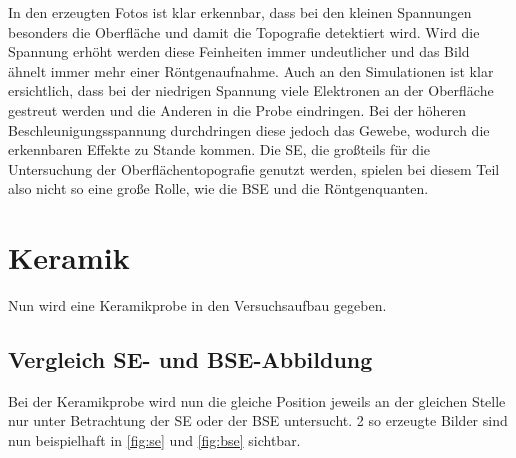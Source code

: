 \documentclass[12pt,english,ngerman]{scrartcl}
\begin{document}
In den erzeugten Fotos ist klar erkennbar, dass bei den kleinen Spannungen
besonders die Oberfläche und damit die Topografie detektiert wird. Wird die
Spannung erhöht werden diese Feinheiten immer undeutlicher und das Bild ähnelt
immer mehr einer Röntgenaufnahme. Auch an den Simulationen ist klar
ersichtlich, dass bei der niedrigen Spannung viele Elektronen an der Oberfläche
gestreut werden und die Anderen in die Probe eindringen. Bei der höheren
Beschleunigungsspannung durchdringen diese jedoch das Gewebe, wodurch die
erkennbaren Effekte zu Stande kommen. Die SE, die großteils für die
Untersuchung der Oberflächentopografie genutzt werden, spielen bei diesem Teil
also nicht so eine große Rolle, wie die BSE und die Röntgenquanten.

\section{Keramik}

Nun wird eine Keramikprobe in den Versuchsaufbau gegeben.

\subsection{Vergleich SE- und BSE-Abbildung}
Bei der Keramikprobe wird nun die gleiche Position jeweils an der gleichen
Stelle nur unter Betrachtung der SE oder der BSE untersucht. 2 so erzeugte
Bilder sind nun beispielhaft in \autoref{fig:se} und \autoref{fig:bse}
sichtbar.
\end{document}
